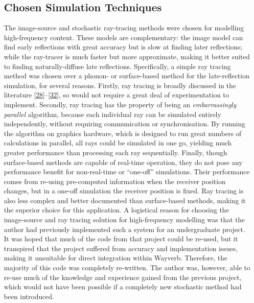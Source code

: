 \documentclass[]{scrreprt}
\begin{document}
\subsection{Chosen Simulation
Techniques}\label{chosen-simulation-techniques}

The image-source and stochastic ray-tracing methods were chosen for
modelling high-frequency content. These models are complementary: the
image model can find early reflections with great accuracy but is slow
at finding later reflections; while the ray-tracer is much faster but
more approximate, making it better suited to finding naturally-diffuse
late reflections. Specifically, a simple ray tracing method was chosen
over a phonon- or surface-based method for the late-reflection
simulation, for several reasons. Firstly, ray tracing is broadly
discussed in the literature
{[}\protect\hyperlink{ref-krokstadux5fcalculatingux5f1968}{28}{]}--{[}\protect\hyperlink{ref-alpkocakux5fcomputingux5f2010}{32}{]},
so would not require a great deal of experimentation to implement.
Secondly, ray tracing has the property of being an \emph{embarrassingly
parallel} algorithm, because each individual ray can be simulated
entirely independently, without requiring communication or
synchronisation. By running the algorithm on graphics hardware, which is
designed to run great numbers of calculations in parallel, all rays
could be simulated in one go, yielding much greater performance than
processing each ray sequentially. Finally, though surface-based methods
are capable of real-time operation, they do not pose any performance
benefit for non-real-time or ``one-off'' simulations. Their performance
comes from re-using pre-computed information when the receiver position
changes, but in a one-off simulation the receiver position is fixed. Ray
tracing is also less complex and better documented than surface-based
methods, making it the superior choice for this application. A
logistical reason for choosing the image-source and ray tracing solution
for high-frequency modelling was that the author had previously
implemented such a system for an undergraduate project. It was hoped
that much of the code from that project could be re-used, but it
transpired that the project suffered from accuracy and implementation
issues, making it unsuitable for direct integration within Wayverb.
Therefore, the majority of this code was completely re-written. The
author was, however, able to re-use much of the knowledge and experience
gained from the previous project, which would not have been possible if
a completely new stochastic method had been introduced.
\end{document}

